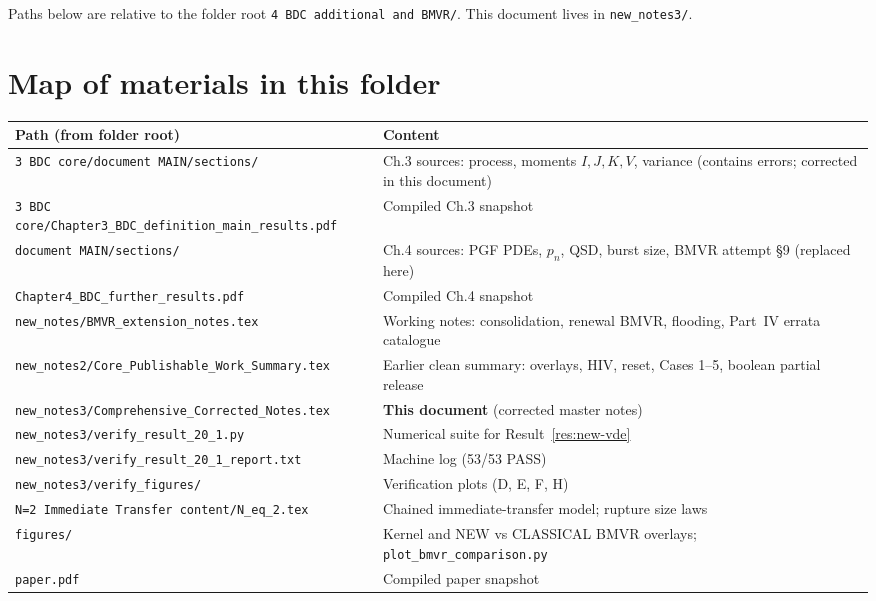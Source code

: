 \documentclass[11pt,a4paper]{article}
\theoremstyle{plain}
\theoremstyle{definition}
\theoremstyle{remark}
\begin{document}
Paths below are relative to the folder root
\texttt{4 BDC additional and BMVR/}. This document lives in
\texttt{new\_notes3/}.

\section{Map of materials in this folder}
\label{sec:map}

\begin{center}
\renewcommand{\arraystretch}{1.2}
{\small
\begin{tabular}{@{}p{}p{}@{}}
\toprule
Path (from folder root) & Content \\
\midrule
\texttt{3 BDC core/document MAIN/sections/} &
  Ch.3 sources: process, moments $I,J,K,V$, variance
  (contains errors; corrected in this document) \\
\texttt{3 BDC core/Chapter3\_BDC\_definition\_main\_results.pdf} &
  Compiled Ch.3 snapshot \\
\texttt{document MAIN/sections/} &
  Ch.4 sources: PGF PDEs, $p_n$, QSD, burst size,
  BMVR attempt \S9 (replaced here) \\
\texttt{Chapter4\_BDC\_further\_results.pdf} &
  Compiled Ch.4 snapshot \\
\texttt{new\_notes/BMVR\_extension\_notes.tex} &
  Working notes: consolidation, renewal BMVR, flooding,
  Part~IV errata catalogue \\
\texttt{new\_notes2/Core\_Publishable\_Work\_Summary.tex} &
  Earlier clean summary: overlays, HIV, reset, Cases 1--5,
  boolean partial release \\
\texttt{new\_notes3/Comprehensive\_Corrected\_Notes.tex} &
  \textbf{This document} (corrected master notes) \\
\texttt{new\_notes3/verify\_result\_20\_1.py} &
  Numerical suite for Result~\ref{res:new-vde} \\
\texttt{new\_notes3/verify\_result\_20\_1\_report.txt} &
  Machine log (53/53 PASS) \\
\texttt{new\_notes3/verify\_figures/} &
  Verification plots (D, E, F, H) \\
\texttt{N=2 Immediate Transfer content/N\_eq\_2.tex} &
  Chained immediate-transfer model; rupture size laws \\
\texttt{figures/} &
  Kernel and NEW vs CLASSICAL BMVR overlays;
  \texttt{plot\_bmvr\_comparison.py} \\
\texttt{paper.pdf} &
  Compiled paper snapshot \\
\bottomrule
\end{tabular}}
\end{center}
\end{document}
